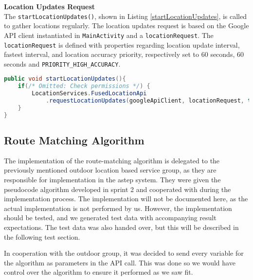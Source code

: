 \textbf{Location Updates Request}\\
The \texttt{startLocationUpdates()}, shown in Listing \ref{startLocationUpdates}, is called to gather locations regularly.
The location updates request is based on the Google API client instantiated in \texttt{MainActivity} and a \texttt{locationRequest}.
The \texttt{locationRequest} is defined with properties regarding location update interval, fastest interval, and location accuracy priority, respectively set to 60 seconds, 60 seconds and \texttt{PRIORITY\_HIGH\_ACCURACY}.

\begin{lstlisting}[language=Java, label=startLocationUpdates, caption=Start location updates functions.]
public void startLocationUpdates(){
	if(/* Omitted: Check permissions */) {
		LocationServices.FusedLocationApi
			.requestLocationUpdates(googleApiClient, locationRequest, this);
	}
}
\end{lstlisting}

\subsection{Route Matching Algorithm}\label{sec:routematchingalgorith}
The implementation of the route-matching algorithm is delegated to the previously mentioned outdoor location based service group, as they are responsible for implementation in the \gls{astep} system.
They were given the pseudocode algorithm developed in sprint 2 and cooperated with during the implementation process.
The implementation will not be documented here, as the actual implementation is not performed by us.
However, the implementation should be tested, and we generated test data with accompanying result expectations.
The test data was also handed over, but this will be described in the following test section.

In cooperation with the outdoor group, it was decided to send every variable for the algorithm as parameters in the API call.
This was done so we would have control over the algorithm to ensure it performed as we saw fit.
